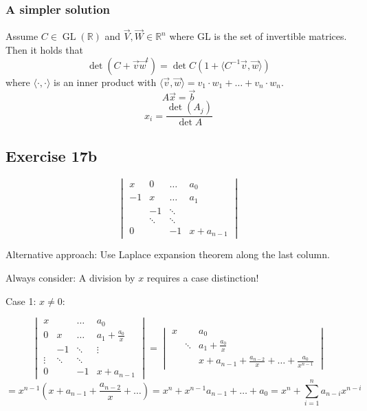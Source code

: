 \documentclass[a4paper]{article}
\theoremstyle{definition}
\begin{document}
\subsubsection{A simpler solution}

Assume $C \in \operatorname{GL}(\mathbb R)$ and $\vec{V}, \vec{W} \in \mathbb R^n$ where GL is the set of invertible matrices.
Then it holds that
\[ \operatorname{det}(C + \vec v \vec w^t) = \det C \left( 1 + \langle C^{-1} \vec v, \vec w\rangle \right) \]
where $\langle \cdot, \cdot \rangle$ is an inner product with $\langle \vec v, \vec w \rangle = v_1 \cdot w_1 + \ldots + v_n \cdot w_n$.
\[ A \vec x = \vec b \]
\[ x_i = \frac{\det(A_j)}{\det{A}} \]

\subsection{Exercise 17b}
\begin{ex}
  \[
    \begin{vmatrix}
      x  & 0  & \ldots & a_0 \\
      -1 & x  & \ldots & a_1 \\
         & -1 & \ddots & \\
         & \ddots & \ddots & \\
      0  &    & -1 & x+a_{n-1}
    \end{vmatrix}
  \]
\end{ex}

Alternative approach: Use Laplace expansion theorem along the last column.

Always consider: A division by $x$ requires a case distinction!

Case 1: $x \neq 0$:

\[
  \begin{vmatrix}
    x &   & \ldots & a_0 \\
    0 & x & \ldots & a_1 + \frac{a_0}{x} \\
      & -1 & \ddots& \vdots \\
    \vdots & \ddots & \ddots & \\
    0 &   & -1 & x + a_{n-1}
  \end{vmatrix}
  =
  \begin{vmatrix}
    x &        & a_0 \\
      & \ddots & a_1 + \frac{a_0}{x} \\
      &        & x + a_{n-1} + \frac{a_{n-2}}{x} + \ldots + \frac{a_0}{x^{n-1}}
  \end{vmatrix}
\] \[
  = x^{n-1} (x + a_{n-1} + \frac{a_{n-2}}{x} + \ldots)
  = x^n + x^{n-1} a_{n-1} + \ldots + a_0
  = x^n + \sum_{i=1}^n a_{n-i} x^{n-i}
\]
\end{document}
